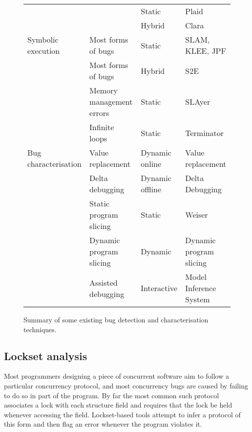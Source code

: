\begin{sidewaysfigure}
\begin{mdframed}
\begin{tabular}{l>{\RaggedRight\arraybackslash}p{5.5cm}lp{10.3cm}}
                               &                                                                             & Static  & Plaid\cite{Sunshine2011}\\
                               &                                                                             & Hybrid  & Clara\cite{Bodden2010}\\
    \hdashline
    Symbolic execution         & Most forms of bugs                           & Static          & SLAM\cite{Ball2011}, KLEE\cite{Cadar}, JPF\cite{Havelund2000} \\
                               & Most forms of bugs                           & Hybrid          & S2E\cite{Chipounov2011} \\
                               & Memory management errors                     & Static          & SLAyer\cite{Berdine2011} \\
                               & Infinite loops                               & Static          & Terminator\cite{Cook2006a} \\
    \hline
    Bug characterisation       & Value replacement                            & Dynamic online  & Value replacement\cite{Jeffrey2009} \\
                               & Delta debugging                              & Dynamic offline & Delta Debugging\cite{Cleve2005,Choi2002} \\
                               & Static program slicing                       & Static          & Weiser\cite{Weiser1981} \\
                               & Dynamic program slicing                      & Dynamic         & Dynamic program slicing\cite{Agrawal1990a} \\
                               & Assisted debugging                           & Interactive     & Model Inference System\cite{Shapiro1982} \\
  \end{tabular}
  \caption{Summary of some existing bug detection and characterisation
    techniques.}
  \label{fig:rw:find_char}
  \end{mdframed}
\end{sidewaysfigure}

\subsection{Lockset analysis}

Most programmers designing a piece of concurrent software aim to
follow a particular concurrency protocol, and most concurrency bugs
are caused by failing to do so in part of the program.  By far the
most common such protocol associates a lock with each structure field
and requires that the lock be held whenever accessing the field.
Lockset-based tools attempt to infer a protocol of this form and then
flag an error whenever the program violates it.

